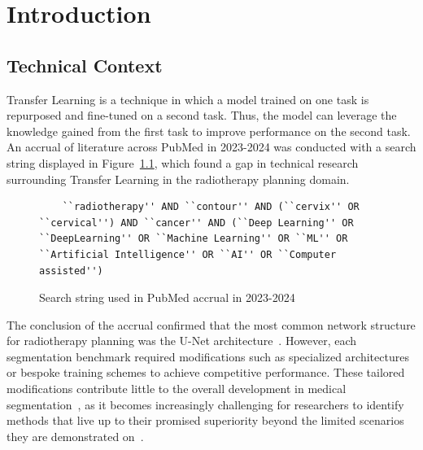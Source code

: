 \documentclass[12pt,twoside]{report}
\begin{document}


\setcounter{page}{1}
\fancyhead[LE,RO]{\slshape \rightmark}
\fancyhead[LO,RE]{\slshape \leftmark}

\chapter{Introduction}

\section{Technical Context}

Transfer Learning is a technique in which a model trained on one task is repurposed and fine-tuned on a second task. Thus, the model can leverage the knowledge gained from the first task to improve performance on the second task. An accrual of literature across PubMed in 2023-2024 was conducted with a search string displayed in Figure~\ref{fig:pubmed-search-string}, which found a gap in technical research surrounding Transfer Learning in the radiotherapy planning domain. 

\begin{figure}[H]
  \begin{lstlisting}
    ``radiotherapy'' AND ``contour'' AND (``cervix'' OR ``cervical'') AND ``cancer'' AND (``Deep Learning'' OR ``DeepLearning'' OR ``Machine Learning'' OR ``ML'' OR ``Artificial Intelligence'' OR ``AI'' OR ``Computer assisted'')  
   \end{lstlisting}
   \caption{Search string used in PubMed accrual in 2023-2024}\label{fig:pubmed-search-string}  
\end{figure}

The conclusion of the accrual confirmed that the most common network structure for radiotherapy planning was the U-Net architecture~\cite{Samarasinghe2021-ps,Lin2021-oz,Sartor2020-et,LIU2020184,Rhee2020-ms,LIU2020172}. However, each segmentation benchmark required modifications such as specialized architectures or bespoke training schemes to achieve competitive performance. These tailored modifications contribute little to the overall development in medical segmentation~\cite{isensee2024nnunet}, as it becomes increasingly challenging for researchers to identify methods that live up to their promised superiority beyond the limited scenarios they are demonstrated on~\cite{nnunet}.
\end{document}
